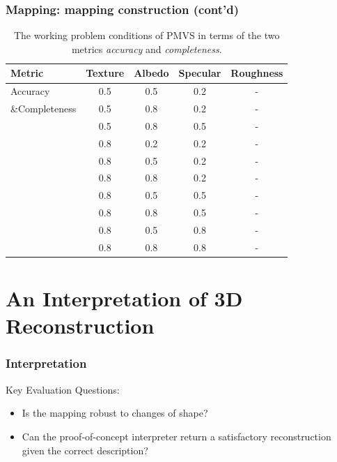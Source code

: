 \documentclass{beamer}
\begin{document}
\begin{frame}
\frametitle{Mapping: mapping construction (cont'd)}

\begin{table}[!htbp]
  \centering
  \begin{tabular}{l*{4}{c}}
  \toprule
  \textbf{Metric} & Texture & Albedo & Specular & Roughness\\
  \midrule
  Accuracy & 0.5 & 0.5 & 0.2 & -\\
  \&Completeness & 0.5 & 0.8 & 0.2 & -\\
           & 0.5 & 0.8 & 0.5 & -\\
           & 0.8 & 0.2 & 0.2 & -\\
           & 0.8 & 0.5 & 0.2 & -\\
           & 0.8 & 0.8 & 0.2 & -\\
           & 0.8 & 0.5 & 0.5 & -\\
           & 0.8 & 0.8 & 0.5 & -\\
           & 0.8 & 0.5 & 0.8 & -\\
           & 0.8 & 0.8 & 0.8 & -\\
  \bottomrule
  \end{tabular}
  \caption{The working problem conditions of PMVS in terms of the two metrics \textit{accuracy} and \textit{completeness}.}
  \label{tab:mvs_training_result}
\end{table}

\end{frame}

\section{An Interpretation of 3D Reconstruction} %


\begin{frame}
\frametitle{Interpretation}

Key Evaluation Questions:
\begin{itemize}
\item Is the mapping robust to changes of shape?
\item Can the proof-of-concept interpreter return a satisfactory reconstruction given the correct description?
\end{itemize}

\end{frame}
\end{document}
